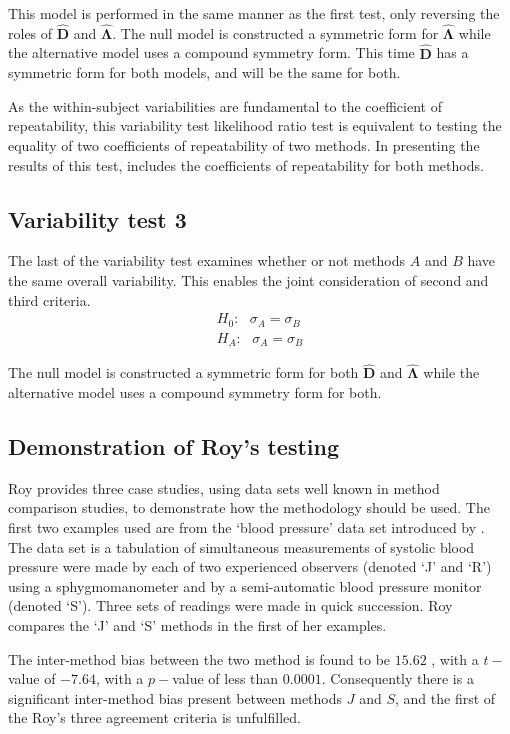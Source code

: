 \documentclass[MAIN.tex]{subfiles}
\begin{document}
	This model is performed in the same manner as the first test, only reversing the roles of $\boldsymbol{\hat{D}}$ and $\boldsymbol{\hat{\Lambda}}$. The null model is constructed a symmetric form for $\boldsymbol{\hat{\Lambda}}$ while the alternative model uses a compound symmetry form. This time $\boldsymbol{\hat{D}}$ has a symmetric form for both models, and will be the same for both.
	
	As the within-subject variabilities are fundamental to the coefficient of repeatability, this variability test likelihood ratio test is equivalent to testing the equality of two coefficients of repeatability of two methods. In presenting the results of this test, \citet{roy} includes the coefficients of repeatability for both methods.
	
	\subsection{Variability test 3}
	The last of the variability test examines whether or not methods $A$ and $B$ have the same overall variability. This enables the joint consideration of second and third criteria.
	\begin{eqnarray*}
		H_{0}: \mbox{ }\sigma_{A}  = \sigma_{B} \\
		H_{A}: \mbox{ }\sigma_{A}  = \sigma_{B}
	\end{eqnarray*}
	
	The null model is constructed a symmetric form for both $\boldsymbol{\hat{D}}$ and $\boldsymbol{\hat{\Lambda}}$ while the alternative model uses a compound symmetry form for both.
	
	\subsection{Demonstration of Roy's testing}
	Roy provides three case studies, using data sets well known in method comparison studies, to demonstrate how the methodology should be used. The first two examples used are from the `blood pressure' data set introduced by \citet{BA99}. The data set is a tabulation of simultaneous measurements of systolic blood pressure were made by each of two experienced observers (denoted `J' and `R') using a sphygmomanometer and by a semi-automatic blood pressure monitor (denoted `S'). Three sets of readings were made in quick succession. Roy compares the `J' and `S' methods in the first of her examples.
	
	The inter-method bias between the two method is found to be $15.62$ , with a $t-$value of $-7.64$, with a $p-$value of less than $0.0001$. Consequently there is a significant inter-method bias present between methods $J$ and $S$, and the first of the Roy's three agreement criteria is unfulfilled.
	
\end{document}
